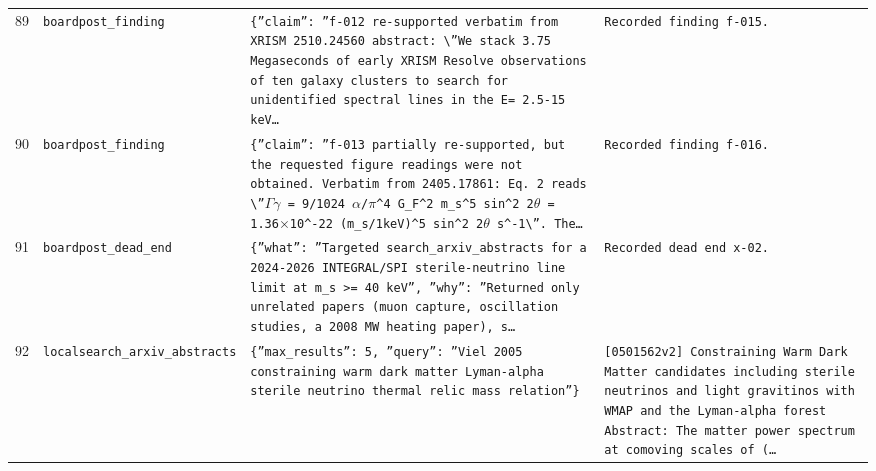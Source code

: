 \documentclass[11pt,a4paper]{article}
\begin{document}
\begin{longtable}{@{}p{}p{}p{}p{}@{}}
89 & \texttt{board}\newline\texttt{post\_\allowbreak{}finding} & \texttt{\{''claim'':\allowbreak{} ''f-012 re-supported verbatim from XRISM 2510.24560 abstract:\allowbreak{} \textbackslash{}\allowbreak{}''We stack 3.75 Megaseconds of early XRISM Resolve observations of ten galaxy clusters to search for unidentified spectral lines in the E=\allowbreak{} 2.5-15 keV\ldots{}\allowbreak{}} & \texttt{Recorded finding f-015.} \\
90 & \texttt{board}\newline\texttt{post\_\allowbreak{}finding} & \texttt{\{''claim'':\allowbreak{} ''f-013 partially re-supported,\allowbreak{} but the requested figure readings were not obtained. Verbatim from 2405.17861:\allowbreak{} Eq. 2 reads \textbackslash{}\allowbreak{}''$\Gamma$$\gamma$ =\allowbreak{} 9/\allowbreak{}1024 $\alpha$/\allowbreak{}$\pi$\textasciicircum{}\allowbreak{}4 G\_\allowbreak{}F\textasciicircum{}\allowbreak{}2 m\_\allowbreak{}s\textasciicircum{}\allowbreak{}5 sin\textasciicircum{}\allowbreak{}2 2$\theta$ =\allowbreak{} 1.36$\times$10\textasciicircum{}\allowbreak{}-22 (m\_\allowbreak{}s/\allowbreak{}1keV)\allowbreak{}\textasciicircum{}\allowbreak{}5 sin\textasciicircum{}\allowbreak{}2 2$\theta$ s\textasciicircum{}\allowbreak{}-1\textbackslash{}\allowbreak{}''. The\ldots{}\allowbreak{}} & \texttt{Recorded finding f-016.} \\
91 & \texttt{board}\newline\texttt{post\_\allowbreak{}dead\_\allowbreak{}end} & \texttt{\{''what'':\allowbreak{} ''Targeted search\_\allowbreak{}arxiv\_\allowbreak{}abstracts for a 2024-2026 INTEGRAL/\allowbreak{}SPI sterile-neutrino line limit at m\_\allowbreak{}s \textgreater{}\allowbreak{}=\allowbreak{} 40 keV'',\allowbreak{} ''why'':\allowbreak{} ''Returned only unrelated papers (muon capture,\allowbreak{} oscillation studies,\allowbreak{} a 2008 MW heating paper)\allowbreak{},\allowbreak{} s\ldots{}\allowbreak{}} & \texttt{Recorded dead end x-02.} \\
92 & \texttt{local}\newline\texttt{search\_\allowbreak{}arxiv\_\allowbreak{}abstracts} & \texttt{\{''max\_\allowbreak{}results'':\allowbreak{} 5,\allowbreak{} ''query'':\allowbreak{} ''Viel 2005 constraining warm dark matter Lyman-alpha sterile neutrino thermal relic mass relation''\}\allowbreak{}} & \texttt{[0501562v2]\allowbreak{} Constraining Warm Dark Matter candidates including sterile neutrinos and light gravitinos with WMAP and the Lyman-alpha forest Abstract:\allowbreak{}   The matter power spectrum at comoving scales of (\ldots{}\allowbreak{}} \\

\end{longtable}
\end{document}

